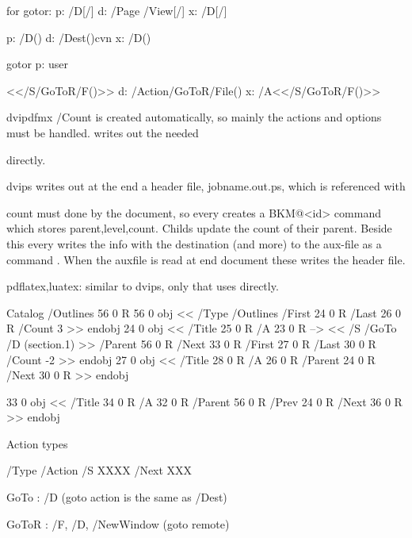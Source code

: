for gotor:
p: /D[\BKM@DO@page/\BKM@DO@view]
d: /Page \BKM@DO@page /View[/\BKM@DO@view]%
x: {/D[\BKM@page/\BKM@view]}

p: /D(\BKM@DO@dest)
d: /Dest(\BKM@DO@dest)cvn%
x: /D(\BKM@dest)

gotor
p: user{ <</S/GoToR/F(\BKM@DO@gotor)\BKM@action>>%
d: /Action/GoToR/File(\BKM@DO@gotor)\BKM@action
x: /A<</S/GoToR/F(\BKM@gotor)\BKM@action>>%
 
dvipdfmx /Count is created automatically, so mainly the actions and options must be handled.
\bookmarks writes out the needed \special directly.

dvips writes out at the end a header file, jobname.out.ps, which is referenced with %
  count must done by the document, so every \bookmark creates a BKM@<id> command which stores {parent,level,count}.
  Childs update the count of their parent. Beside this every \bookmark writes the info with the destination (and more) to the aux-file as
  a command \BKM@entry. When the auxfile is read at end document these \BKM@entry writes the header file.

pdflatex,luatex: similar to dvips, only that \BKM@entry uses \pdfoutline directly.
 
    
    
Catalog
   /Outlines 56 0 R
             56 0 obj
             <<
            /Type /Outlines
            /First 24 0 R
            /Last 26 0 R
            /Count 3
            >>
            endobj
               24 0 obj
               <<
               /Title 25 0 R
               /A 23 0 R      --> << /S /GoTo /D (section.1) >>
               /Parent 56 0 R
               /Next 33 0 R
               /First 27 0 R
               /Last 30 0 R
               /Count -2
               >>
               endobj
                  27 0 obj
                 <<
                 /Title 28 0 R
                 /A 26 0 R
                 /Parent 24 0 R
                 /Next 30 0 R
                 >>
                 endobj

               33 0 obj
               <<
               /Title 34 0 R
               /A 32 0 R
               /Parent 56 0 R
               /Prev 24 0 R
               /Next 36 0 R
               >>
               endobj


Action types

/Type /Action /S XXXX /Next XXX

GoTo  : /D  (goto action is the same as /Dest)

GoToR : /F, /D, /NewWindow (goto remote)

}
